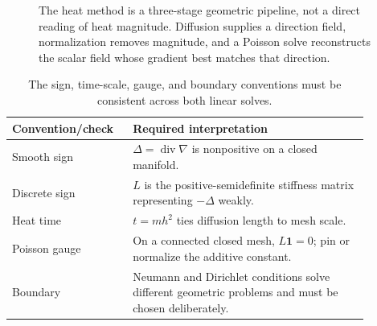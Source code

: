 \begin{figure}[htbp]
\centering
{}
\caption{The heat method is a three-stage geometric pipeline, not a direct reading of
heat magnitude. Diffusion supplies a direction field, normalization removes magnitude,
and a Poisson solve reconstructs the scalar field whose gradient best matches that direction.}
\label{fig:vii40-c07-heat-pipeline}
\end{figure}

\begin{table}[htbp]
\centering\small
\begin{tabular}{p{0.27\linewidth}p{0.61\linewidth}}
\toprule
Convention/check & Required interpretation\\
\midrule
Smooth sign & $\Delta=\operatorname{div}\nabla$ is nonpositive on a closed manifold.\\
Discrete sign & $L$ is the positive-semidefinite stiffness matrix representing $-\Delta$ weakly.\\
Heat time & $t=mh^2$ ties diffusion length to mesh scale.\\
Poisson gauge & On a connected closed mesh, $L\mathbf 1=0$; pin or normalize the additive constant.\\
Boundary & Neumann and Dirichlet conditions solve different geometric problems and must be chosen deliberately.\\
\bottomrule
\end{tabular}
\caption{The sign, time-scale, gauge, and boundary conventions must be consistent across both linear solves.}
\label{tab:vii40-c07-heat-conventions}
\end{table}
